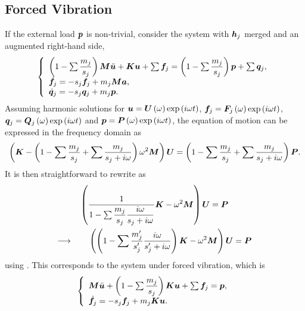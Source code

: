 \subsection{Forced Vibration}
If the external load $\bm{p}$ is non-trivial, consider the system  with $\bm{h}_j$ merged and an augmented right-hand side,
\begin{gather}
    \left\{\begin{array}{l}
        \left(1-\sum\dfrac{m_j}{s_j}\right)\bm{M}\ddot{\bm{u}}+\bm{K}\bm{u}+\sum\bm{f}_j=\left(1-\sum\dfrac{m_j}{s_j}\right)\bm{p}+\sum\bm{q}_j, \\
        \dot{\bm{f}}_j=-s_j\bm{f}_j+m_j\bm{M}\bm{a},                                                                                      \\
        \dot{\bm{q}}_j=-s_j\bm{q}_j+m_j\bm{p}.
    \end{array}\right.
\end{gather}
Assuming harmonic solutions for $\bm{u}=\bm{U}\left(\omega\right)\exp\left(i\omega{}t\right)$, $\bm{f}_j=\bm{F}_j\left(\omega\right)\exp\left(i\omega{}t\right)$, $\bm{q}_j=\bm{Q}_j\left(\omega\right)\exp\left(i\omega{}t\right)$ and $\bm{p}=\bm{P}\left(\omega\right)\exp\left(i\omega{}t\right)$, the equation of motion can be expressed in the frequency domain as
\begin{gather}\label{eq:forced_freq}
    \left(\bm{K}-\left(1-\sum\dfrac{m_j}{s_j}+\sum\dfrac{m_j}{s_j+i\omega}\right)\omega^2\bm{M}\right)\bm{U}=\left(1-\sum\dfrac{m_j}{s_j}+\sum\dfrac{m_j}{s_j+i\omega}\right)\bm{P}.
\end{gather}
It is then straightforward to rewrite  as
\begin{multline}
    \left(\dfrac{1}{1-\sum\dfrac{m_j}{s_j}\dfrac{i\omega}{s_j+i\omega}}\bm{K}-\omega^2\bm{M}\right)\bm{U}=\bm{P}\\\longrightarrow\qquad\left(\left(1-\sum\dfrac{m'_j}{s'_j}\dfrac{i\omega}{s'_j+i\omega}\right)\bm{K}-\omega^2\bm{M}\right)\bm{U}=\bm{P}
\end{multline}
using .
This corresponds to the system  under forced vibration, which is
\begin{gather}
    \left\{\begin{array}{l}
        \bm{M}\ddot{\bm{u}}+\left(1-\sum\dfrac{m_j}{s_j}\right)\bm{K}\bm{u}+\sum\bm{f}_j=\bm{p}, \\
        \dot{\bm{f}}_j=-s_j\bm{f}_j+m_j\bm{K}\bm{u}.
    \end{array}\right.
\end{gather}

